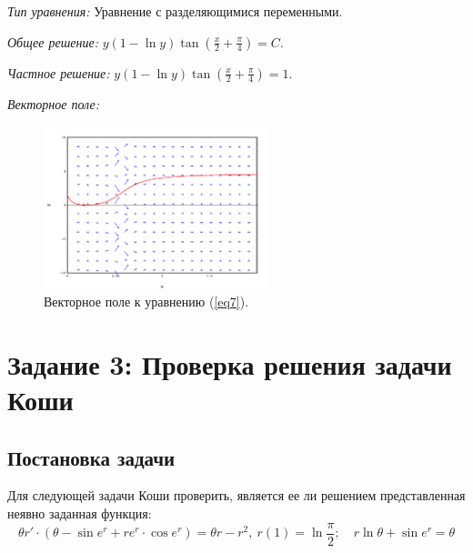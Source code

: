 \documentclass[14pt, a4paper, titlepage, fleqn]{extarticle}
\begin{document}
\begin{enumerate}
                    \textit{Тип уравнения:}
                        Уравнение с разделяющимися переменными.

                    \textit{Общее решение:}
                        \(
                            \displaystyle
                            y(1 - \ln{y}) \tan\left( \frac{x}{2} + \frac{\pi}{4} \right) = C. %
                        \)

                    \textit{Частное решение:}
                        \(
                            \displaystyle
                            y(1 - \ln{y}) \tan\left( \frac{x}{2} + \frac{\pi}{4} \right) = 1.
                        \)

                    \textit{Векторное поле:}

                        \begin{figure}[H]
                            \centering
                            \includegraphics[width=6.5cm]{pictures/vector_field_7_1.pdf}
                            \caption{Векторное поле к уравнению (\ref{eq7}).}
                        \end{figure}

            \end{enumerate}

    \pagebreak

    \section{Задание 3: Проверка решения задачи Коши}

        \subsection{Постановка задачи}
            Для следующей задачи Коши проверить, является ее ли
            решением представленная неявно заданная функция:
            \[
                \theta r' \cdot \left( \theta - \sin{e^r} + r e^r \cdot \cos{e^r} \right)
                = \theta r - r^2, ~ r(1) = \ln{\frac{\pi}{2}}; \quad r \ln{\theta} + \sin{e^r} = \theta
            \]
\end{document}
